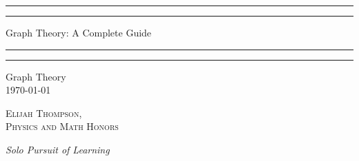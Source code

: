 \documentclass[12pt, a4paper, oneside, openright, titlepage]{book}
\begin{document}

\begin{titlepage}
    \centering
    \scshape
    \vspace*{\baselineskip}
    \rule{\textwidth}{1.6pt}\vspace*{-\baselineskip}\vspace*{2pt}
    \rule{\textwidth}{0.4pt}
    
    \vspace{0.75\baselineskip}
    
    {\LARGE Graph Theory: A Complete Guide}
    
    \vspace{0.75\baselineskip}
    
    \rule{\textwidth}{0.4pt}\vspace*{-\baselineskip}\vspace{3.2pt}
    \rule{\textwidth}{1.6pt}
    
    \vspace{2\baselineskip}
    Graph Theory \\
    \vspace*{3\baselineskip}
    \monthdayyeardate\today \\
    \vspace*{5.0\baselineskip}
    
    {\scshape\Large Elijah Thompson, \\ Physics and Math Honors\\}
    
    \vspace{1.0\baselineskip}
    \textit{Solo Pursuit of Learning}
    \vfill
    \enlargethispage{1in}
    \begin{figure}[b!]
    \end{figure}
\end{titlepage}

\tableofcontents






\begin{appendices}


\end{appendices}
\end{document}
